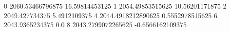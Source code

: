 0 2060.53466796875 16.59814453125
1 2054.49853515625 10.56201171875
2 2049.427734375 5.4912109375
4 2044.4918212890625 0.5552978515625
6 2043.9365234375 0.0
8 2043.2799072265625 -0.6566162109375
